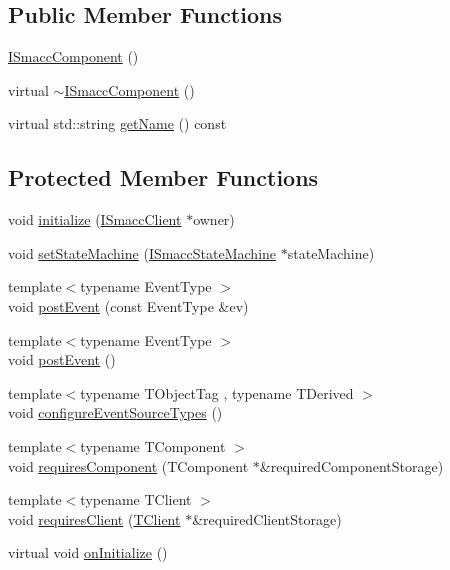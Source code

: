 \subsection*{Public Member Functions}
\begin{DoxyCompactItemize}
\item 
\hyperlink{classsmacc_1_1ISmaccComponent_a43952d7269ddb81d017a80f018fe502e}{I\+Smacc\+Component} ()
\item 
virtual \hyperlink{classsmacc_1_1ISmaccComponent_a46f5cfc6a308de938b6ee3a5e80a8fe9}{$\sim$\+I\+Smacc\+Component} ()
\item 
virtual std\+::string \hyperlink{classsmacc_1_1ISmaccComponent_a8bfa94b1b1c616d55837ebba1b426c6e}{get\+Name} () const
\end{DoxyCompactItemize}
\subsection*{Protected Member Functions}
\begin{DoxyCompactItemize}
\item 
void \hyperlink{classsmacc_1_1ISmaccComponent_a3378552cb1a86aa26a07c0edc057448b}{initialize} (\hyperlink{classsmacc_1_1ISmaccClient}{I\+Smacc\+Client} $\ast$owner)
\item 
void \hyperlink{classsmacc_1_1ISmaccComponent_afe57665a6982475e8f9c2a5885e986e1}{set\+State\+Machine} (\hyperlink{classsmacc_1_1ISmaccStateMachine}{I\+Smacc\+State\+Machine} $\ast$state\+Machine)
\item 
{\footnotesize template$<$typename Event\+Type $>$ }\\void \hyperlink{classsmacc_1_1ISmaccComponent_a687dead5b87a3b9781b9bf6ab0b7afa5}{post\+Event} (const Event\+Type \&ev)
\item 
{\footnotesize template$<$typename Event\+Type $>$ }\\void \hyperlink{classsmacc_1_1ISmaccComponent_a84455564c2c4b90be58e900050232722}{post\+Event} ()
\item 
{\footnotesize template$<$typename T\+Object\+Tag , typename T\+Derived $>$ }\\void \hyperlink{classsmacc_1_1ISmaccComponent_ad1c9ede43be1f83c10c6e7a2e14db8d3}{configure\+Event\+Source\+Types} ()
\item 
{\footnotesize template$<$typename T\+Component $>$ }\\void \hyperlink{classsmacc_1_1ISmaccComponent_aa06d58b1dcec3c513ca2edddfd3847ec}{requires\+Component} (T\+Component $\ast$\&required\+Component\+Storage)
\item 
{\footnotesize template$<$typename T\+Client $>$ }\\void \hyperlink{classsmacc_1_1ISmaccComponent_a36c085d906fbae0fcaee817aaeafebf4}{requires\+Client} (\hyperlink{classTClient}{T\+Client} $\ast$\&required\+Client\+Storage)
\item 
virtual void \hyperlink{classsmacc_1_1ISmaccComponent_ae6f71d008db12553912e9436184b9e65}{on\+Initialize} ()
\end{DoxyCompactItemize}
